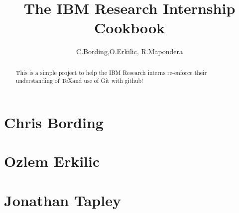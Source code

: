\documentclass[11pt,a4paper]{report}
\title{The IBM Research  Internship Cookbook}
\author{C.Bording,O.Erkilic, R.Mapondera}
\begin{document}
\maketitle
\tableofcontents

\begin{abstract}

This is a simple project to help the IBM Research interns re-enforce their understanding of \TeX and use of Git with github!

\end{abstract}

\chapter{Chris Bording}


\chapter{Ozlem Erkilic}


\chapter{Jonathan Tapley}

\end{document}
